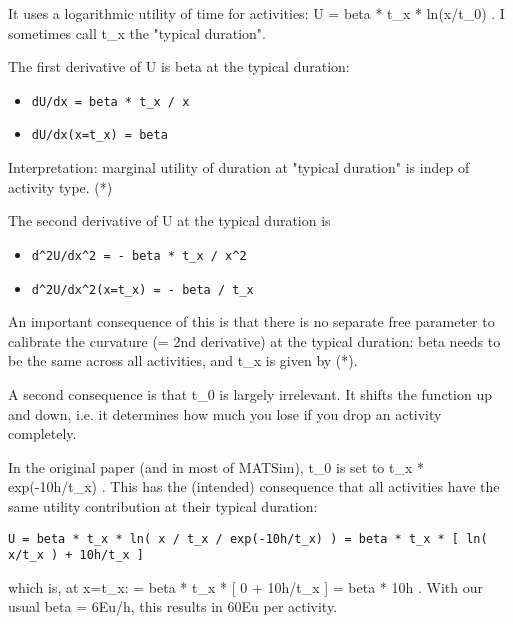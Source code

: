 \documentclass[a4paper,11pt]{report}
\begin{document}
It uses a logarithmic utility of time for activities: U = beta * t\_x *  ln(x/t\_0) . I sometimes call t\_x the "typical duration".

The first derivative of U is beta at the typical duration:
\begin{itemize}
	\item 
\begin{verbatim}
dU/dx = beta * t_x / x
\end{verbatim}
	\item 
\begin{verbatim}
dU/dx(x=t_x) = beta
\end{verbatim}
\end{itemize}

Interpretation: marginal utility of duration at "typical duration" is indep of activity type. (*)

The second derivative of U at the typical duration is
\begin{itemize}
	\item 
\begin{verbatim}
d^2U/dx^2 = - beta * t_x / x^2
\end{verbatim}
	\item 
\begin{verbatim}
d^2U/dx^2(x=t_x) = - beta / t_x
\end{verbatim}
\end{itemize}

An  important consequence of this is that there is no separate  free  parameter to calibrate the curvature (= 2nd derivative) at the  typical  duration: beta needs to be the same across all activities, and  t\_x is  given by (*).

A second consequence is that t\_0 is largely  irrelevant. It  shifts the function up and down, i.e. it determines how  much you lose  if you drop an activity completely.



In the  original paper (and in most of MATSim), t\_0 is set to t\_x *   exp(-10h/t\_x) . This has the (intended) consequence that all  activities  have the same utility contribution at their typical  duration:
\begin{verbatim}
U = beta * t_x * ln( x / t_x / exp(-10h/t_x) ) = beta * t_x * [ ln( x/t_x ) + 10h/t_x ]
\end{verbatim}

which   is, at x=t\_x: = beta * t\_x * [ 0 + 10h/t\_x ] = beta *  10h . With  our usual beta = 6Eu/h, this results in 60Eu per  activity.
\end{document}
